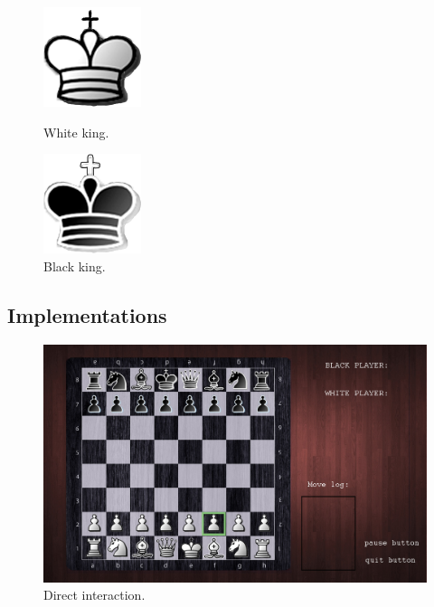 \documentclass[12pt, a4paper]{article}
\begin{document}
\begin{figure}[h!]
\centering
\begin{minipage}{.5\textwidth}
  \centering
  \includegraphics[width=.4\linewidth]{figures/whiteking.png}
  \caption{White king.}
\end{minipage}%
\begin{minipage}{.5\textwidth}
  \centering
  \includegraphics[width=.4\linewidth]{figures/blackking.png}
  \caption{Black king.}
\end{minipage}
\end{figure}

\vfill
\clearpage

\newpage
\vfill
\subsection{Implementations}
\begin{figure}[ht!]
\centering
\includegraphics[width=0.9\linewidth]{figures/directimplementation.jpg}
\caption{Direct interaction.}
\end{figure}
\end{document}
